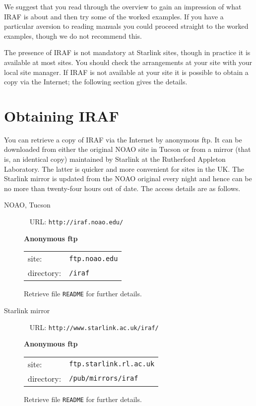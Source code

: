 \documentclass[twoside,11pt]{article}
\newcommand{\htmladdnormallink}[2]{#1}
\newcommand{\xlabel}[1]{}
\begin{document}
We suggest that you read through the overview to gain an impression
of what IRAF is about and then try some of the worked examples.  If
you have a particular aversion to reading manuals you could proceed
straight to the worked examples, though we do not recommend this.

The presence of IRAF is not mandatory at Starlink sites, though in
practice it is available at most sites.  You should check the
arrangements at your site with your local site manager.
If IRAF is not available at your site it is possible to obtain a copy
via the Internet; the following section gives the details.


\section{\xlabel{OBTAIN}\label{OBTAIN}Obtaining IRAF}

You can retrieve a copy of IRAF via the Internet by anonymous ftp.  It
can be downloaded from either the original NOAO site in Tucson or from a
mirror (that is, an identical copy) maintained by Starlink at the Rutherford
Appleton Laboratory.  The latter is quicker and more convenient for sites
in the UK.  The Starlink mirror is updated from the NOAO original every
night and hence can be no more than twenty-four hours out of date.  The
access details are as follows.

\begin{description}

  \item[NOAO, Tucson] ~
  \newline URL: \htmladdnormallink{ {\tt http://iraf.noao.edu/} }
   {http://iraf.noao.edu/}

   {\bf Anonymous ftp}

  \begin{tabular}{ll}
   site:      & {\tt ftp.noao.edu} \\
   directory: & {\tt /iraf}        \\
  \end{tabular}

   Retrieve file {\tt README} for further details.

  \item[Starlink mirror] ~
  \newline URL: \htmladdnormallink{ {\tt http://www.starlink.ac.uk/iraf/} }
   {http://www.starlink.ac.uk/iraf/}

   {\bf Anonymous ftp}

  \begin{tabular}{ll}
   site:      & {\tt ftp.starlink.rl.ac.uk} \\
   directory: & {\tt /pub/mirrors/iraf}     \\
  \end{tabular}

   Retrieve file {\tt README} for further details.

\end{description}
\end{document}
